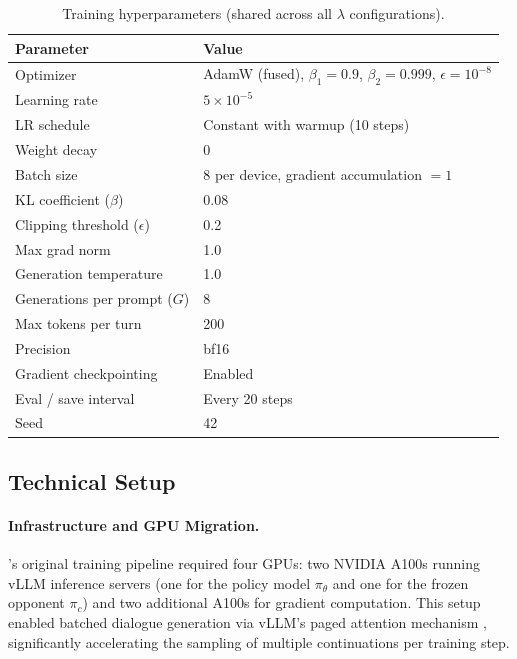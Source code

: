 \documentclass[12pt,a4paper]{article}
\renewcommand{\arraystretch}{1.25}
\begin{document}
\begin{table}[H]
\centering
\caption{Training hyperparameters (shared across all $\lambda$ configurations).}
\label{tab:hyperparams}
\renewcommand{\arraystretch}{1.15}
\begin{tabular}{ll}
\toprule
\textbf{Parameter} & \textbf{Value} \\
\midrule
Optimizer & AdamW (fused), $\beta_1 = 0.9$, $\beta_2 = 0.999$, $\epsilon = 10^{-8}$ \\
Learning rate & $5 \times 10^{-5}$ \\
LR schedule & Constant with warmup (10 steps) \\
Weight decay & 0 \\
Batch size & 8 per device, gradient accumulation $= 1$ \\
KL coefficient ($\beta$) & 0.08 \\
Clipping threshold ($\epsilon$) & 0.2 \\
Max grad norm & 1.0 \\
Generation temperature & 1.0 \\
Generations per prompt ($G$) & 8 \\
Max tokens per turn & 200 \\
Precision & bf16 \\
Gradient checkpointing & Enabled \\
Eval / save interval & Every 20 steps \\
Seed & 42 \\
\bottomrule
\end{tabular}
\end{table}


\subsection{Technical Setup}\label{sec:technical}

\paragraph{Infrastructure and GPU Migration.}
\citet{franceschetti2025advantage}'s original training pipeline required four GPUs: two NVIDIA A100s running vLLM inference servers (one for the policy model $\pi_\theta$ and one for the frozen opponent $\pi_c$) and two additional A100s for gradient computation. This setup enabled batched dialogue generation via vLLM's paged attention mechanism \citep{kwon2023efficientmemorymanagementlarge}, significantly accelerating the sampling of multiple continuations per training step.
\end{document}
